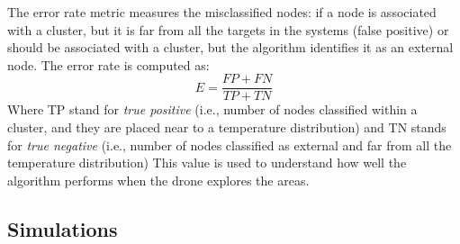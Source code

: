 The error rate metric measures the misclassified nodes:
 if a node is associated with a cluster, but it is far
 from all the targets in the systems (false positive)
 or should be associated with a cluster, but the algorithm identifies it as an external node.
 The error rate is computed as:
 $$
  E = \frac{FP + FN}{TP + TN}
 $$
 Where TP stand for \emph{true positive} (i.e., number of nodes classified within a cluster, and they are placed near to a temperature distribution) and
 TN stands for \emph{true negative} (i.e., number of nodes classified as external and far from all the temperature distribution)
 This value is used to understand how well the algorithm
 performs when the drone explores the areas.

\subsection{Simulations}\label{s:simulations}



